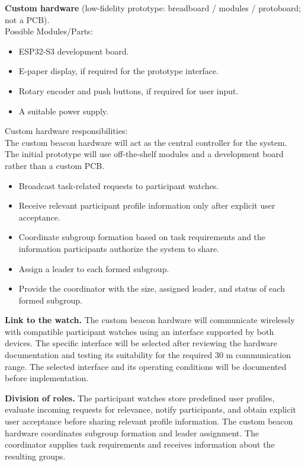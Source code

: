 \documentclass[10pt]{article}
\begin{document}
\textbf{Custom hardware} (low-fidelity prototype: breadboard / modules / protoboard; not a PCB).\\
Possible Modules/Parts:
\begin{itemize}
    \item ESP32-S3 development board.
    \item E-paper display, if required for the prototype interface.
    \item Rotary encoder and push buttons, if required for user input.
    \item A suitable power supply.
\end{itemize}
Custom hardware responsibilities:\\The custom beacon hardware will act as the central controller for the system. The initial prototype will use off-the-shelf modules and a development board rather than a custom PCB.
\begin{itemize}
  \item Broadcast task-related requests to participant watches.
  \item Receive relevant participant profile information only after explicit user acceptance.
  \item Coordinate subgroup formation based on task requirements and the information participants authorize the system to share.
  \item Assign a leader to each formed subgroup.
  \item Provide the coordinator with the size, assigned leader, and status of each formed subgroup.
\end{itemize}
\textbf{Link to the watch.} The custom beacon hardware will communicate wirelessly with compatible participant watches using an interface supported by both devices. The specific interface will be selected after reviewing the hardware documentation and testing its suitability for the required 30 m communication range. The selected interface and its operating conditions will be documented before implementation.

\textbf{Division of roles.} The participant watches store predefined user profiles, evaluate incoming requests for relevance, notify participants, and obtain explicit user acceptance before sharing relevant profile information. The custom beacon hardware coordinates subgroup formation and leader assignment. The coordinator supplies task requirements and receives information about the resulting groups.

\end{document}
